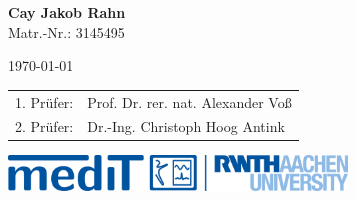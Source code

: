 \begin{titlepage}
	\begin{minipage}[t]{9cm}
		\centering \textbf{Cay Jakob Rahn} \\ \centering Matr.-Nr.: 3145495
	\end{minipage}
	
	\vspace{1cm}
	
	\begin{minipage}[b]{4cm}
		\centering \today
	\end{minipage}


	\vspace{2cm}

	\begin{minipage}[t]{10cm}
		\centering \begin{tabular}{ll}
		1. Prüfer: & Prof. Dr. rer. nat. Alexander Voß\\
		2. Prüfer: & Dr.-Ing. Christoph Hoog Antink
		\end{tabular}
	\end{minipage}


	\vspace{2cm}

	\begin{flushleft}
	\centering \hspace{-3cm}
	\begin{minipage}[t]{5cm}
			\includegraphics[width=9cm]{./pic/Logo_MedIT_RWTH.png}
	\end{minipage}
	\end{flushleft}
	\restoregeometry


\end{titlepage}